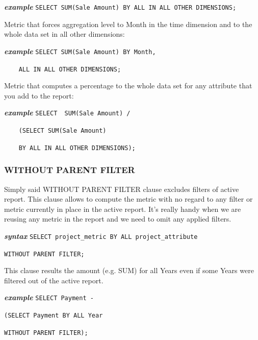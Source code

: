 \documentclass[a4paper, 12pt, titlepage, fleqn]{article}
\begin{document}
\textbf{\emph{example}}  \hspace{.9cm}\verb=SELECT SUM(Sale Amount) BY ALL IN ALL OTHER DIMENSIONS;=

\noindent Metric that forces aggregation level to Month in the time dimension and to the whole data set in all other dimensions: 

\textbf{\emph{example}}  \hspace{.9cm}\verb=SELECT SUM(Sale Amount) BY Month,=

\hspace{2.2cm}\verb=	ALL IN ALL OTHER DIMENSIONS;=

\noindent Metric that computes a percentage to the whole data set for any attribute that you add to the report: 

\textbf{\emph{example}}  \hspace{.9cm}\verb=SELECT  SUM(Sale Amount) /=

\hspace{2.2cm}\verb=	(SELECT SUM(Sale Amount)=

\hspace{2.2cm}\verb=	BY ALL IN ALL OTHER DIMENSIONS);=

\subsubsection{WITHOUT PARENT FILTER}
Simply said WITHOUT PARENT FILTER clause excludes filters of active report. This clause allows to compute the metric with no regard to any filter or metric currently in place in the active report. It's really handy when we are reusing any metric in the report and we need to omit any applied filters. 

\textbf{\emph{syntax}}  \hspace{.9cm}\verb=SELECT project_metric BY ALL project_attribute=

\hspace{2.2cm}\verb=WITHOUT PARENT FILTER;=

This clause results the amount (e.g. SUM) for all Years even if some Years were filtered out of the active report.

\textbf{\emph{example}}  \hspace{.9cm}\verb=SELECT Payment -=

\hspace{2.4cm}\verb=(SELECT Payment BY ALL Year=

\hspace{2.4cm}\verb=WITHOUT PARENT FILTER);=
\end{document}
